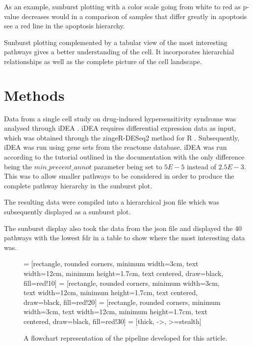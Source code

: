 \documentclass[11pt]{article}
\begin{document}
  As an example, sunburst plotting with a color scale going from white to red as p-value decreases would in a comparison of samples that differ greatly in apoptosis see a red line in the apoptosis hierarchy.

  Sunburst plotting complemented by a tabular view of the most interesting pathways gives a better understanding of the cell. It incorporates hierarchial relationships as well as the complete picture of the cell landscape.


\section*{Methods}
  Data from a single cell study on drug-induced hypersensitivity syndrome was analysed through iDEA \cite{idea}. iDEA requires differential expression data as input, which was obtained through the zingeR-DESeq2 method for R \cite{deseq2}. Subsequently, iDEA was run using gene sets from the reactome database. iDEA was run according to the tutorial outlined in the documentation with the only difference being the $min\_precent\_annot$ parameter being set to $5E-5$ instead of $2.5E-3$. This was to allow smaller pathways to be considered in order to produce the complete pathway hierarchy in the sunburst plot.

  The resulting data were compiled into a hierarchical json file which was subsequently displayed as a sunburst plot.

  The sunburst display also took the data from the json file and displayed the 40 pathways with the lowest fdr in a table to show where the most interesting data was.

  \begin{figure}[t]
    \centering
     = [rectangle, rounded corners, minimum width=3cm, text width=12cm, minimum height=1.7cm, text centered, draw=black, fill=red!10]
     = [rectangle, rounded corners, minimum width=3cm, text width=12cm, minimum height=1.7cm, text centered, draw=black, fill=red!20]
     = [rectangle, rounded corners, minimum width=3cm, text width=12cm, minimum height=1.7cm, text centered, draw=black, fill=red!30]
     = [thick, ->, >=stealth]

  \caption{ A flowchart representation of the pipeline developed for this article.}
  \label{Pipeline flowchart}
\end{figure}
\end{document}
